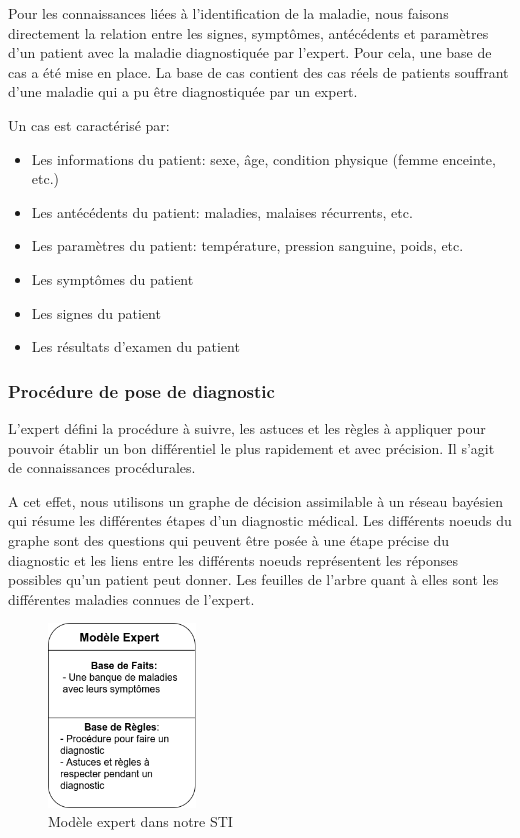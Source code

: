     Pour les connaissances liées à l'identification de la maladie, nous faisons directement la relation entre les signes, symptômes, antécédents et paramètres d'un patient avec la maladie diagnostiquée par l'expert. Pour cela, une base de cas a été mise en place. La base de cas contient des cas réels de patients souffrant d'une maladie qui a pu être diagnostiquée par un expert.
    
    Un cas est caractérisé par:
    \begin{itemize}
        \item Les informations du patient: sexe, âge, condition physique (femme enceinte, etc.)
        \item Les antécédents du patient: maladies, malaises récurrents, etc.
        \item Les paramètres du patient: température, pression sanguine, poids, etc.
        \item Les symptômes du patient
        \item Les signes du patient
        \item Les résultats d'examen du patient
    \end{itemize}
    
    
    \subsubsection{Procédure de pose de diagnostic}
    L'expert défini la procédure à suivre, les astuces et les règles à appliquer pour pouvoir établir un bon différentiel le plus rapidement et avec précision. Il s'agit de connaissances procédurales.
    
    A cet effet, nous utilisons un graphe de décision assimilable à un réseau bayésien qui résume les différentes étapes d'un diagnostic médical.
    Les différents noeuds du graphe sont des questions qui peuvent être posée à une étape précise du diagnostic et les liens entre les différents noeuds représentent les réponses possibles qu'un patient peut donner. Les feuilles de l'arbre quant à elles sont les différentes maladies connues de l'expert.
    
    \begin{figure}[H]
        \centering
        \includegraphics[width=0.35\textwidth]{figures/concept_expert.png}
        \captionsetup{justification=centering}
        \caption{Modèle expert dans notre STI}
        \label{fig:3}
    \end{figure}
    
